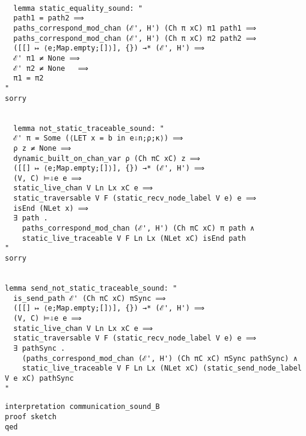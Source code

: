 \documentclass{article}
\begin{document}
\begin{lstlisting}[style=codestyle1, escapechar=\%]

  lemma static_equality_sound: "
  path1 = path2 ⟹
  paths_correspond_mod_chan (ℰ', H') (Ch π xC) π1 path1 ⟹
  paths_correspond_mod_chan (ℰ', H') (Ch π xC) π2 path2 ⟹
  ([[] ↦ ⟨e;Map.empty;[]⟩], {}) →* (ℰ', H') ⟹ 
  ℰ' π1 ≠ None ⟹ 
  ℰ' π2 ≠ None   ⟹ 
  π1 = π2
"
sorry


  lemma not_static_traceable_sound: "
  ℰ' π = Some (⟨LET x = b in e⇩n;ρ;κ⟩) ⟹
  ρ z ≠ None ⟹
  dynamic_built_on_chan_var ρ (Ch πC xC) z ⟹
  ([[] ↦ ⟨e;Map.empty;[]⟩], {}) →* (ℰ', H') ⟹ 
  (V, C) ⊨⇩e e ⟹
  static_live_chan V Ln Lx xC e ⟹
  static_traversable V F (static_recv_node_label V e) e ⟹
  isEnd (NLet x) ⟹
  ∃ path . 
    paths_correspond_mod_chan (ℰ', H') (Ch πC xC) π path ∧
    static_live_traceable V F Ln Lx (NLet xC) isEnd path
"
sorry


lemma send_not_static_traceable_sound: "
  is_send_path ℰ' (Ch πC xC) πSync ⟹
  ([[] ↦ ⟨e;Map.empty;[]⟩], {}) →* (ℰ', H') ⟹ 
  (V, C) ⊨⇩e e ⟹
  static_live_chan V Ln Lx xC e ⟹
  static_traversable V F (static_recv_node_label V e) e ⟹
  ∃ pathSync .
    (paths_correspond_mod_chan (ℰ', H') (Ch πC xC) πSync pathSync) ∧ 
    static_live_traceable V F Ln Lx (NLet xC) (static_send_node_label V e xC) pathSync
"
  \end{lstlisting}


\begin{lstlisting}[style=codestyle1, escapechar=\%]
interpretation communication_sound_B
proof sketch
qed
  \end{lstlisting}


\begin{lstlisting}[style=codestyle1, escapechar=\%]
  \end{lstlisting}


\begin{lstlisting}[style=codestyle1, escapechar=\%]
  \end{lstlisting}


\begin{lstlisting}[style=codestyle1, escapechar=\%]
  \end{lstlisting}


\begin{lstlisting}[style=codestyle1, escapechar=\%]

  \end{lstlisting}
\end{document}
